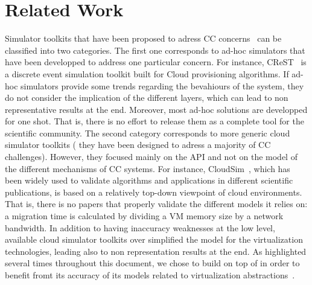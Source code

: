 \section{Related Work}
\label{sec:related}
Simulator toolkits that  have been proposed
to adress CC concerns~\cite{cloudsim,CC13,DGSIM,greencloud,icancloud}
can be classified into two categories.
 The first one corresponds to ad-hoc simulators that have been developped to
address one particular concern. For instance, CReST~\cite{CC13} is a
discrete event simulation toolkit built for Cloud provisioning
algorithms. If ad-hoc simulators provide some trends
regarding the bevahiours of the system, they do not consider the
implication of the different layers, which can lead to non
representative results at the end. Moreover, most ad-hoc solutions are
developped for one shot. That is, there is no effort to release them
as a complete tool for the scientific community. The second category
\cite{cloudsim,greencloud,icancloud}
corresponds to more generic cloud simulator toolkits (\ie
they have been designed to adress a majority of CC
challenges). However,  they focused mainly on the API and not on
the model of the different mechanisms of CC systems. For instance, CloudSim~\cite{cloudsim}, which has been widely used to
validate algorithms and applications in different scientific
publications, is based on a relatively top-down viewpoint of cloud
environments.  That is, there is no papers that properly validate the
different models it relies on: a migration time is calculated by
dividing a VM memory size by a network bandwidth.
 In addition to having inaccuracy weaknesses at the low level, available cloud
simulator toolkits over simplified the model for the virtualization
technologies, leading also to non representation results at the
end. As highlighted several times throughout this document, we chose to
build \vmps on top of \sg in order to benefit fromt its accuracy of
its models related to virtualization abstractions~\cite{Hirofuchi:2013:ALM:2568486.2568524}.
